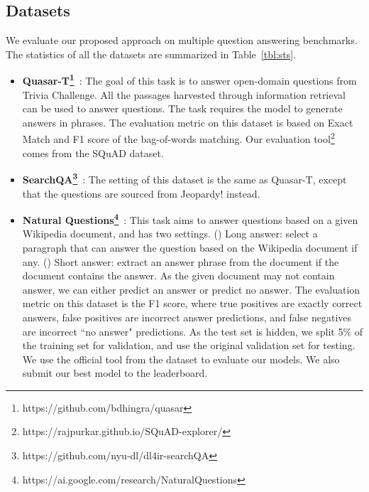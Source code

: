 \subsection{Datasets}
We evaluate our proposed approach on 
multiple question answering benchmarks. 
The statistics of all the datasets are summarized in Table~\ref{tbl:sts}.
\begin{itemize}[itemsep=1pt,topsep=2pt,leftmargin=12pt]
\item
\textbf{Quasar-T\footnote{https://github.com/bdhingra/quasar}}~\citep{dhingra2017quasar}: The goal of this task is to answer open-domain questions from Trivia Challenge. All the passages harvested through information retrieval can be used to answer questions. The task requires the model to generate answers in phrases. The evaluation metric on this dataset is based on Exact Match and F1 score of the bag-of-words matching. 
Our evaluation tool\footnote{https://rajpurkar.github.io/SQuAD-explorer/} comes from the SQuAD dataset.
\item
\textbf{SearchQA\footnote{https://github.com/nyu-dl/dl4ir-searchQA}}~\citep{dunn2017searchqa}: The setting of this dataset is the same as Quasar-T, except that the questions are sourced from Jeopardy! instead.
\item
\textbf{Natural Questions\footnote{https://ai.google.com/research/NaturalQuestions}}~\citep{kwiatkowski2019natural}: This task aims to answer questions based on a given Wikipedia document, and has two settings.
() Long answer: select a paragraph that can answer the question based on the Wikipedia document if any.
() Short answer: extract an answer phrase from the document if the document contains the answer.
As the given document may not contain answer, we can either predict an answer or predict no answer. 
The evaluation metric on this dataset is the F1 score, where
true positives are exactly correct answers, false positives are incorrect answer predictions, and false negatives are incorrect ``no answer" predictions.
As the test set is hidden, we split 5\% of the training set for validation, and use the original validation set for testing.
We use the official tool from the dataset to evaluate our models. We also submit our best  model to the leaderboard.
\end{itemize}


